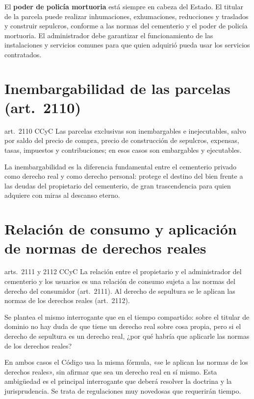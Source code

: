 \documentclass[12pt,oneside]{book}
\begin{document}
El \textbf{poder de policía mortuoria} está siempre en cabeza del Estado. El titular de la parcela puede realizar inhumaciones, exhumaciones, reducciones y traslados y construir sepulcros, conforme a las normas del cementerio y el poder de policía mortuoria. El administrador debe garantizar el funcionamiento de las instalaciones y servicios comunes para que quien adquirió pueda usar los servicios contratados.

\section{Inembargabilidad de las parcelas (art.~2110)}

\begin{regla}{art.~2110 CCyC}
Las parcelas exclusivas son inembargables e inejecutables, salvo por saldo del precio de compra, precio de construcción de sepulcros, expensas, tasas, impuestos y contribuciones; en esos casos son embargables y ejecutables.
\end{regla}

\begin{importante}
La inembargabilidad es la diferencia fundamental entre el cementerio privado como derecho real y como derecho personal: protege el destino del bien frente a las deudas del propietario del cementerio, de gran trascendencia para quien adquiere con miras al descanso eterno.
\end{importante}

\section{Relación de consumo y aplicación de normas de derechos reales}

\begin{regla}{arts.~2111 y 2112 CCyC}
La relación entre el propietario y el administrador del cementerio y los usuarios es una relación de consumo sujeta a las normas del derecho del consumidor (art.~2111). Al derecho de sepultura se le aplican las normas de los derechos reales (art.~2112).
\end{regla}

Se plantea el mismo interrogante que en el tiempo compartido: sobre el titular de dominio no hay duda de que tiene un derecho real sobre cosa propia, pero si el derecho de sepultura es un derecho real, ¿por qué habría que aplicarle las normas de los derechos reales?

\begin{importante}
En ambos casos el Código usa la misma fórmula, «se le aplican las normas de los derechos reales», sin afirmar que sea un derecho real en sí mismo. Esta ambigüedad es el principal interrogante que deberá resolver la doctrina y la jurisprudencia. Se trata de regulaciones muy novedosas que requerirán tiempo.
\end{importante}
\end{document}
